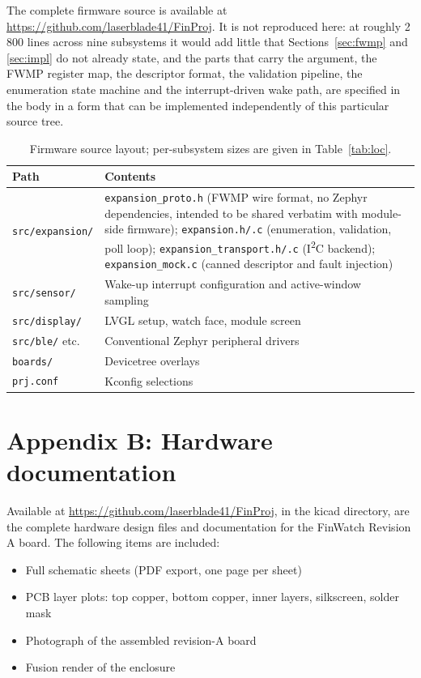 \documentclass[12pt, a4paper]{article}
\newcommand{\repourl}{\url{https://github.com/laserblade41/FinProj}}
\begin{document}
The complete firmware source is available at \repourl. It is not
reproduced here: at roughly 2\,800 lines across nine subsystems it would add
little that Sections~\ref{sec:fwmp} and \ref{sec:impl} do not already state, and
the parts that carry the argument, the FWMP register map, the descriptor
format, the validation pipeline, the enumeration state machine and the
interrupt-driven wake path, are specified in the body in a form that can be
implemented independently of this particular source tree.

\begin{table}[H]
\centering
\small
\begin{tabular}{@{}l p{9.4cm}@{}}
\toprule
\textbf{Path} & \textbf{Contents} \\
\midrule
\texttt{src/expansion/} & \texttt{expansion\_proto.h} (FWMP wire format, no Zephyr dependencies, intended to be shared verbatim with module-side firmware); \texttt{expansion.h/.c} (enumeration, validation, poll loop); \texttt{expansion\_transport.h/.c} (I\textsuperscript{2}C backend); \texttt{expansion\_mock.c} (canned descriptor and fault injection) \\
\texttt{src/sensor/} & Wake-up interrupt configuration and active-window sampling \\
\texttt{src/display/} & LVGL setup, watch face, module screen \\
\texttt{src/ble/} etc. & Conventional Zephyr peripheral drivers \\
\texttt{boards/} & Devicetree overlays \\
\texttt{prj.conf} & Kconfig selections \\
\bottomrule
\end{tabular}
\caption{Firmware source layout; per-subsystem sizes are given in Table~\ref{tab:loc}.}
\label{tab:tree}
\end{table}

\newpage
\section{Appendix B: Hardware documentation}
\label{app:hw}

Available at \repourl, in the kicad directory, are the complete hardware design files and documentation for the FinWatch Revision A board. The following items are included:
\begin{itemize}
  \item Full schematic sheets (PDF export, one page per sheet)
  \item PCB layer plots: top copper, bottom copper, inner layers, silkscreen, solder mask
  \item Photograph of the assembled revision-A board
  \item Fusion render of the enclosure
\end{itemize}
\end{document}
